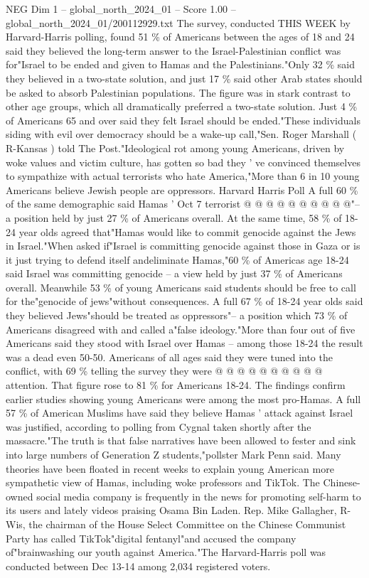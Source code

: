 \begin{textsample}{NEG Dim 1 – global\_north\_2024\_01 – Score 1.00 – global\_north\_2024\_01/200112929.txt}  \label{ex:f1_neg_297}
The survey, conducted THIS WEEK by Harvard-Harris polling, found 51 \% of Americans between the ages of 18 and 24 said they believed the long-term answer to the Israel-Palestinian conflict was for"Israel to be ended and given to Hamas and the Palestinians."Only 32 \% said they believed in a two-state solution, and just 17 \% said other Arab states should be asked to absorb Palestinian populations.
The figure was in stark contrast to other age groups, which all dramatically preferred a two-state solution.
Just 4 \% of Americans 65 and over said they felt Israel should be ended."These individuals siding with evil over democracy should be a wake-up call,"Sen.
Roger Marshall ( R-Kansas ) told The Post."Ideological rot among young Americans, driven by woke values and victim culture, has gotten so bad they ' ve convinced themselves to sympathize with actual terrorists who hate America,"More than 6 in 10 young Americans believe Jewish people are oppressors.
Harvard Harris Poll A full 60 \% of the same demographic said Hamas ' Oct 7 terrorist @ @ @ @ @ @ @ @ @ @"-- a position held by just 27 \% of Americans overall.
At the same time, 58 \% of 18-24 year olds agreed that"Hamas would like to commit genocide against the Jews in Israel."When asked if"Israel is committing genocide against those in Gaza or is it just trying to defend itself andeliminate Hamas,"60 \% of Americas age 18-24 said Israel was committing genocide -- a view held by just 37 \% of Americans overall.
Meanwhile 53 \% of young Americans said students should be free to call for the"genocide of jews"without consequences.
A full 67 \% of 18-24 year olds said they believed Jews"should be treated as oppressors"-- a position which 73 \% of Americans disagreed with and called a"false ideology."More than four out of five Americans said they stood with Israel over Hamas -- among those 18-24 the result was a dead even 50-50.
Americans of all ages said they were tuned into the conflict, with 69 \% telling the survey they were @ @ @ @ @ @ @ @ @ @ attention.
That figure rose to 81 \% for Americans 18-24.
The findings confirm earlier studies showing young Americans were among the most pro-Hamas.
A full 57 \% of American Muslims have said they believe Hamas ' attack against Israel was justified, according to polling from Cygnal taken shortly after the massacre."The truth is that false narratives have been allowed to fester and sink into large numbers of Generation Z students,"pollster Mark Penn said.
Many theories have been floated in recent weeks to explain young American more sympathetic view of Hamas, including woke professors and TikTok.
The Chinese-owned social media company is frequently in the news for promoting self-harm to its users and lately videos praising Osama Bin Laden.
Rep.
Mike Gallagher, R-Wis, the chairman of the House Select Committee on the Chinese Communist Party has called TikTok"digital fentanyl"and accused the company of"brainwashing our youth against America."The Harvard-Harris poll was conducted between Dec 13-14 among 2,034 registered voters.

\end{textsample}
